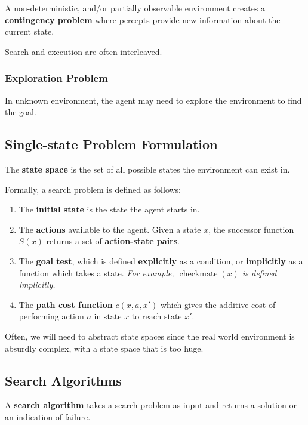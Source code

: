 A non-deterministic, and/or partially observable environment creates a \textbf{contingency problem} where percepts provide new information about the current state.

Search and execution are often interleaved.


\subsubsection{Exploration Problem}

In unknown environment, the agent may need to explore the environment to find the goal.


\subsection{Single-state Problem Formulation}

The \textbf{state space} is the set of all possible states the environment can exist in.

Formally, a search problem is defined as follows:

\begin{enumerate}[leftmargin=*]
    \item The \textbf{initial state} is the state the agent starts in.
    \item The \textbf{actions} available to the agent. Given a state $x$, the successor function $S(x)$ returns a set of \textbf{action-state pairs}.
    \item The \textbf{goal test}, which is defined \textbf{explicitly} as a condition, or \textbf{implicitly} as a function which takes a state. \emph{For example, $\operatorname{checkmate}(x)$ is defined implicitly.}
    \item The \textbf{path cost function} $c(x, a, x')$ which gives the additive cost of performing action $a$ in state $x$ to reach state $x'$.
\end{enumerate}

Often, we will need to abstract state spaces since the real world environment is absurdly complex, with a state space that is too huge.


\subsection{Search Algorithms}

A \textbf{search algorithm} takes a search problem as input and returns a solution or an indication of failure.

